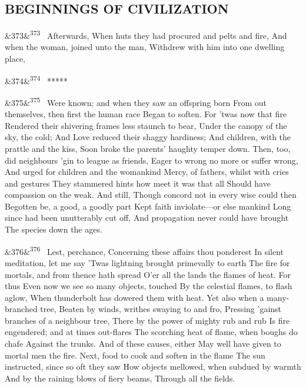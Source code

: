 \documentclass[12pt]{article}
\newcommand{\para}[1][]{\par\noindent\ifx&#1&\else\textsuperscript{\footnotesize #1}~\fi}
\begin{document}
\subsection*{BEGINNINGS OF CIVILIZATION}

\para[373] Afterwards, When huts they had procured and pelts and fire, And when the woman, joined unto the man, Withdrew with him into one dwelling place,

\para[374] *****

\para[375] Were known; and when they saw an offspring born From out themselves, then first the human race Began to soften. For 'twas now that fire Rendered their shivering frames less staunch to bear, Under the canopy of the sky, the cold; And Love reduced their shaggy hardiness; And children, with the prattle and the kiss, Soon broke the parents' haughty temper down. Then, too, did neighbours 'gin to league as friends, Eager to wrong no more or suffer wrong, And urged for children and the womankind Mercy, of fathers, whilst with cries and gestures They stammered hints how meet it was that all Should have compassion on the weak. And still, Though concord not in every wise could then Begotten be, a good, a goodly part Kept faith inviolate---or else mankind Long since had been unutterably cut off, And propagation never could have brought The species down the ages.

\para[376] Lest, perchance, Concerning these affairs thou ponderest In silent meditation, let me say 'Twas lightning brought primevally to earth The fire for mortals, and from thence hath spread O'er all the lands the flames of heat. For thus Even now we see so many objects, touched By the celestial flames, to flash aglow, When thunderbolt has dowered them with heat. Yet also when a many-branched tree, Beaten by winds, writhes swaying to and fro, Pressing 'gainst branches of a neighbour tree, There by the power of mighty rub and rub Is fire engendered; and at times out-flares The scorching heat of flame, when boughs do chafe Against the trunks. And of these causes, either May well have given to mortal men the fire. Next, food to cook and soften in the flame The sun instructed, since so oft they saw How objects mellowed, when subdued by warmth And by the raining blows of fiery beams, Through all the fields.
\end{document}

